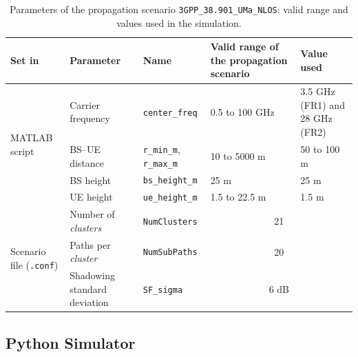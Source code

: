 \begin{table}[htbp]
\caption{Parameters of the propagation scenario \texttt{3GPP\_38.901\_UMa\_NLOS}: valid range and values used in the simulation.}
\label{tab:cenario_uma}
\vspace{4pt} %
\centering
\footnotesize
\renewcommand{\arraystretch}{1.2}
\setlength{\aboverulesep}{0pt}
\setlength{\belowrulesep}{0pt}
\begin{tabular}{|p{1.9cm}|p{2.6cm}|p{3.0cm}|p{2.6cm}|p{2.6cm}|}
\toprule
\centering\textbf{Set in} & \centering\textbf{Parameter} & \centering\textbf{Name} & \centering\textbf{Valid range of the propagation scenario} & \centering\textbf{Value used} \tabularnewline
\midrule
\multirow{4}{=}{\raggedright MATLAB script} & \raggedright Carrier frequency & \raggedright \texttt{center\_\allowbreak{}freq} & \raggedright 0.5 to 100 GHz & \raggedright 3.5 GHz (FR1) and 28 GHz (FR2) \tabularnewline
\cline{2-5}
 & \raggedright BS--UE distance & \raggedright \texttt{r\_\allowbreak{}min\_\allowbreak{}m}, \texttt{r\_\allowbreak{}max\_\allowbreak{}m} & \raggedright 10 to 5000 m & \raggedright 50 to 100 m \tabularnewline
\cline{2-5}
 & \raggedright BS height & \raggedright \texttt{bs\_\allowbreak{}height\_\allowbreak{}m} & \raggedright 25 m & \raggedright 25 m \tabularnewline
\cline{2-5}
 & \raggedright UE height & \raggedright \texttt{ue\_\allowbreak{}height\_\allowbreak{}m} & \raggedright 1.5 to 22.5 m & \raggedright 1.5 m \tabularnewline
\midrule
\multirow{3}{=}{\raggedright Scenario file (\texttt{.conf})} & \raggedright Number of \textit{clusters} & \raggedright \texttt{NumClusters} & \multicolumn{2}{c|}{21} \tabularnewline
\cline{2-5}
 & \raggedright Paths per \textit{cluster} & \raggedright \texttt{NumSubPaths} & \multicolumn{2}{c|}{20} \tabularnewline
\cline{2-5}
 & \raggedright Shadowing standard deviation & \raggedright \texttt{SF\_\allowbreak{}sigma} & \multicolumn{2}{c|}{6 dB} \tabularnewline
\bottomrule
\end{tabular}
\vspace{4pt}
\end{table}






\subsection{Python Simulator}\label{subsec:setup_python}

